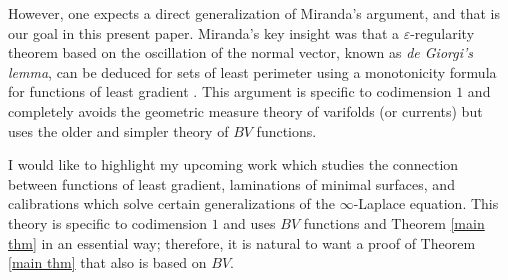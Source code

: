 \documentclass[reqno,11pt]{amsart}
\newcommand{\dfn}[1]{\emph{#1}\index{#1}}
\theoremstyle{definition}
\numberwithin{equation}{section}
\begin{document}
However, one expects a direct generalization of Miranda's argument, and that is our goal in this present paper.
Miranda's key insight was that a $\varepsilon$-regularity theorem based on the oscillation of the normal vector, known as \dfn{de Giorgi's lemma}, can be deduced for sets of least perimeter using a monotonicity formula for functions of least gradient \cite{Miranda66}.
This argument is specific to codimension $1$ and completely avoids the geometric measure theory of varifolds (or currents) but uses the older and simpler theory of $BV$ functions.

I would like to highlight my upcoming work \cite{BackusCML,BackusInfinityMaxwell1} which studies the connection between functions of least gradient, laminations of minimal surfaces, and calibrations which solve certain generalizations of the $\infty$-Laplace equation.
This theory is specific to codimension $1$ and uses $BV$ functions and Theorem \ref{main thm} in an essential way; therefore, it is natural to want a proof of Theorem \ref{main thm} that also is based on $BV$.

\end{document}
